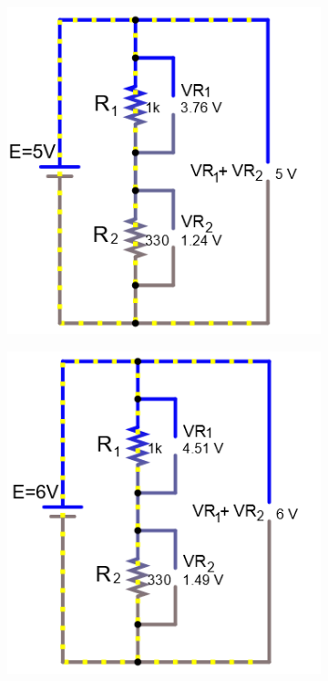 \documentclass[a4paper]{article}
\begin{document}
\begin{figure}
\begin{subfigure}{0.48\textwidth}
\includegraphics[width=1.03\linewidth]{volts_5}
\end{subfigure}
\begin{subfigure}{0.48\textwidth}
\includegraphics[width=1.03\linewidth]{volts_6}

\end{subfigure}
\end{figure}
\end{document}
